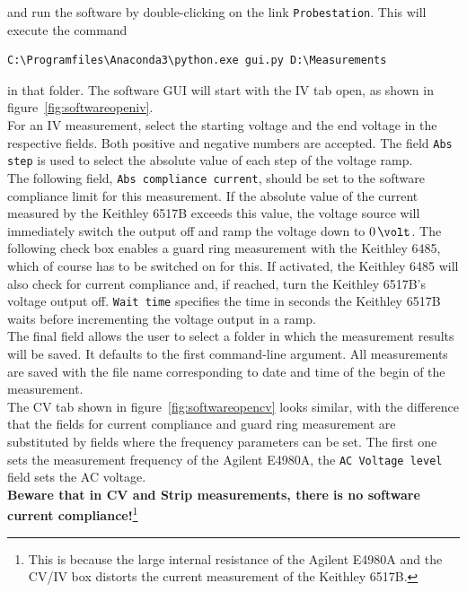 \documentclass[a4paper]{article}
\begin{document}
and run the software by double-clicking on the link {\tt Probestation}.
This will execute the command

\medskip
\begin{lstlisting}
C:\Programfiles\Anaconda3\python.exe gui.py D:\Measurements
\end{lstlisting}
\medskip

in that folder.
The software GUI will start with the IV tab open, as shown in figure~\ref{fig:softwareopeniv}.\\

For an IV measurement, select the starting voltage and the end voltage in the respective fields.
Both positive and negative numbers are accepted.
The field {\tt Abs step} is used to select the absolute value of each step of the voltage ramp.\\

The following field, {\tt Abs compliance current}, should be set to the software compliance limit for this measurement.
If the absolute value of the current measured by the Keithley 6517B exceeds this value, the voltage source will immediately switch the output off and ramp the voltage down to $0\,\volt$.
The following check box enables a guard ring measurement with the Keithley 6485, which of course has to be switched on for this.
If activated, the Keithley 6485 will also check for current compliance and, if reached, turn the Keithley 6517B's voltage output off.
{\tt Wait time} specifies the time in seconds the Keithley 6517B waits before incrementing the voltage output in a ramp.\\

The final field allows the user to select a folder in which the measurement results will be saved.
It defaults to the first command-line argument.
All measurements are saved with the file name corresponding to date and time of the begin of the measurement.\\

The CV tab shown in figure~\ref{fig:softwareopencv} looks similar, with the difference that the fields for current compliance and guard ring measurement are substituted by fields where the frequency parameters can be set.
The first one sets the measurement frequency of the Agilent E4980A, the {\tt AC Voltage level} field sets the AC voltage.\\

{\bf Beware that in CV and Strip measurements, there is no software current compliance!}\footnote{This is because the large internal resistance of the Agilent E4980A and the CV/IV box distorts the current measurement of the Keithley 6517B.}\\
\end{document}
